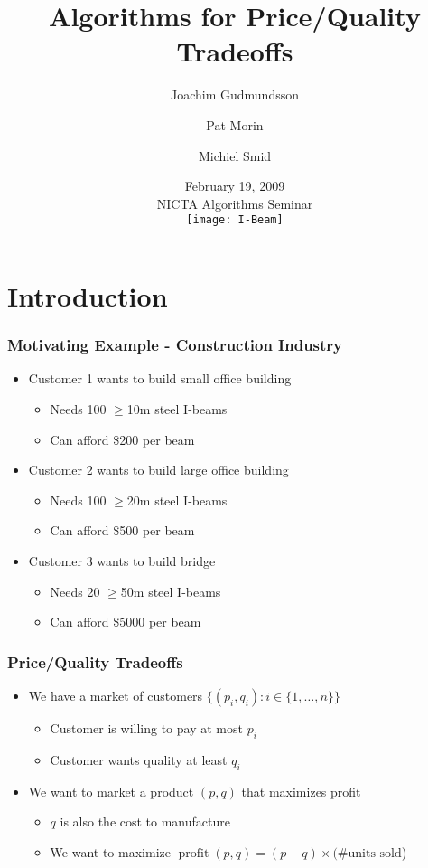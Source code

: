 \documentclass{beamer}
\title{Algorithms for Price/Quality Tradeoffs}
\author{Joachim Gudmundsson
	\and Pat Morin
	\and Michiel Smid}
\date{February 19, 2009 \\ NICTA Algorithms Seminar \\
  \texttt{[image: I-Beam]} }
\DeclareMathOperator{\val}{profit}
\begin{document}
\frame{\titlepage}


\section{Introduction}


\frame
{
  \frametitle{Motivating Example - Construction Industry}
  \begin{itemize}
    \item Customer 1 wants to build small office building
      \begin{itemize}
        \item Needs 100 $\ge$10m steel I-beams
        \item Can afford \$200 per beam
      \end{itemize}
    \item Customer 2 wants to build large office building
      \begin{itemize}
        \item Needs 100 $\ge$20m steel I-beams
        \item Can afford \$500 per beam
      \end{itemize}
    \item Customer 3 wants to build bridge
      \begin{itemize}
        \item Needs 20 $\ge$50m steel I-beams
        \item Can afford \$5000 per beam
      \end{itemize}
  \end{itemize}
}

\frame
{
  \frametitle{Price/Quality Tradeoffs}
  \begin{itemize}
    \item We have a market of customers $\{(p_i,q_i):i\in\{1,\ldots,n\}\}$
    \begin{itemize}
      \item Customer is willing to pay at most $p_i$
      \item Customer wants quality at least $q_i$
    \end{itemize}
    \item We want to market a product $(p,q)$ that maximizes profit
    \begin{itemize}
      \item $q$ is also the cost to manufacture
      \item We want to maximize 
          $\val(p,q) = (p-q)\times(\mbox{\# units sold}$)
    \end{itemize}
  \end{itemize}
}
\end{document}

